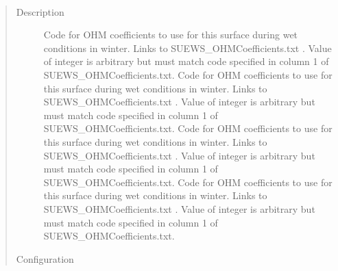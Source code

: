 \documentclass[letterpaper,10pt,english]{sphinxmanual}
\begin{document}

\begin{fulllineitems}
\label{\detokenize{input_files/SUEWS_SiteInfo/Input_Options:cmdoption-arg-ohmcode-winterwet}}~\begin{quote}\begin{description}
\item[{Description}] \leavevmode
Code for OHM coefficients to use for this surface during wet conditions in winter. Links to SUEWS\_OHMCoefficients.txt . Value of integer is arbitrary but must match code specified in column 1 of SUEWS\_OHMCoefficients.txt.  Code for OHM coefficients to use for this surface during wet conditions in winter. Links to SUEWS\_OHMCoefficients.txt . Value of integer is arbitrary but must match code specified in column 1 of SUEWS\_OHMCoefficients.txt.  Code for OHM coefficients to use for this surface during wet conditions in winter. Links to SUEWS\_OHMCoefficients.txt . Value of integer is arbitrary but must match code specified in column 1 of SUEWS\_OHMCoefficients.txt.  Code for OHM coefficients to use for this surface during wet conditions in winter. Links to SUEWS\_OHMCoefficients.txt . Value of integer is arbitrary but must match code specified in column 1 of SUEWS\_OHMCoefficients.txt.

\item[{Configuration}] \leavevmode


\end{description}
\end{quote}
\end{fulllineitems}
\end{document}
